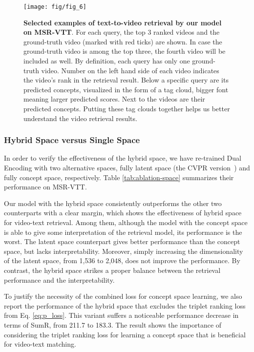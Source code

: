 \begin{figure*}[tb!]
\centering\texttt{[image: fig/fig\_6]}
\caption{\textbf{Selected examples of text-to-video retrieval by our model on MSR-VTT}. For each query, the top 3 ranked videos and the ground-truth video (marked with red ticks) are shown. In case the ground-truth video is among the top three, the fourth video will be included as well. By definition, each query has only one ground-truth video. Number on the left hand side of each video indicates the video's rank in the retrieval result. Below a specific query are its predicted concepts, visualized in the form of a tag cloud, bigger font meaning larger predicted scores. Next to the videos are their predicted concepts. Putting these tag clouds together helps us better understand the video retrieval results.}\label{fig:wordcloud}
\end{figure*}

\subsubsection{Hybrid Space versus Single Space}\label{sssec:hybrid-space}

In order to verify the effectiveness of the hybrid space, we have re-trained Dual Encoding with two alternative spaces, \ie fully latent space (the CVPR version~\cite{cvpr2019-dual-dong}) and fully concept space, respectively. Table \ref{tab:ablation-space} summarizes their performance on MSR-VTT.

Our model with the hybrid space consistently outperforms the other two counterparts with a clear margin, which shows the effectiveness of hybrid space for video-text retrieval.
Among them, although the model with the concept space is able to give some interpretation of the retrieval model, its performance is the worst. The latent space counterpart gives better performance than the concept space, but lacks interpretability. 
Moreover, simply increasing the dimensionality of the latent space, from 1,536 to 2,048, does not improve the performance. 
By contrast, the hybrid space strikes a proper balance between the retrieval performance and the interpretability.


To justify the necessity of the combined loss for concept space learning, we also report the performance of the hybrid space that excludes the triplet ranking loss from Eq. \ref{eq:p_loss}. This variant suffers a noticeable performance decrease in terms of SumR, from 211.7 to 183.3. The result shows the importance of considering the triplet ranking loss for learning a concept space that is beneficial for video-text matching. 


